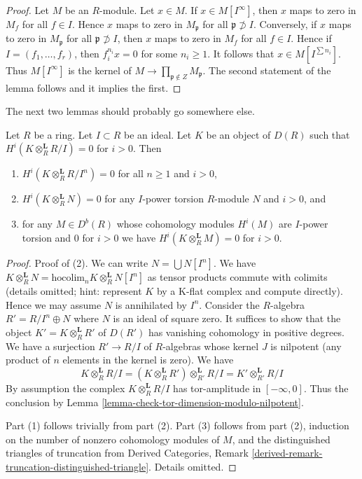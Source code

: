 \begin{proof}
Let $M$ be an $R$-module. Let $x \in M$. If $x \in M[I^\infty]$, then $x$
maps to zero in $M_f$ for all $f \in I$. Hence $x$ maps to zero in
$M_\mathfrak p$ for all $\mathfrak p \not \supset I$. Conversely, if $x$
maps to zero in $M_\mathfrak p$ for all $\mathfrak p \not \supset I$,
then $x$ maps to zero in $M_f$ for all $f \in I$. Hence if
$I = (f_1, \ldots, f_r)$, then $f_i^{n_i}x = 0$ for some $n_i \geq 1$.
It follows that $x \in M[I^{\sum n_i}]$. Thus $M[I^\infty]$ is
the kernel of $M \to \prod_{\mathfrak p \not \in Z} M_\mathfrak p$.
The second statement of the lemma follows and it implies the first.
\end{proof}

\noindent
The next two lemmas should probably go somewhere else.

\begin{lemma}
\label{lemma-bounded-above-mod-I}
Let $R$ be a ring. Let $I \subset R$ be an ideal. Let $K$ be an object of
$D(R)$ such that $H^i(K \otimes_R^\mathbf{L} R/I) = 0$ for $i > 0$. Then
\begin{enumerate}
\item $H^i(K \otimes_R^\mathbf{L} R/I^n) = 0$ for all $n \geq 1$
and $i > 0$,
\item $H^i(K \otimes_R^\mathbf{L} N) = 0$ for any $I$-power torsion
$R$-module $N$ and $i > 0$, and
\item for any $M \in D^b(R)$ whose cohomology modules $H^i(M)$
are $I$-power torsion and $0$ for $i > 0$ we have
$H^i(K \otimes_R^\mathbf{L} M) = 0$ for $i > 0$.
\end{enumerate}
\end{lemma}

\begin{proof}
Proof of (2). We can write $N = \bigcup N[I^n]$. We have
$K \otimes_R^\mathbf{L} N = \text{hocolim}_n K \otimes_R^\mathbf{L} N[I^n]$
as tensor products commute with colimits (details omitted; hint: represent
$K$ by a K-flat complex and compute directly).
Hence we may assume $N$ is annihilated by $I^n$.
Consider the $R$-algebra $R' = R/I^n \oplus N$
where $N$ is an ideal of square zero. It suffices to show that the object
$K' = K \otimes_R^\mathbf{L} R'$ of $D(R')$ has vanishing cohomology
in positive degrees.
We have a surjection $R' \to R/I$ of $R$-algebras whose kernel $J$
is nilpotent (any product of $n$ elements in the kernel is zero).
We have
$$
K \otimes_R^\mathbf{L} R/I =
(K \otimes_R^\mathbf{L} R') \otimes_{R'}^\mathbf{L} R/I =
K' \otimes_{R'}^\mathbf{L} R/I
$$
By assumption the complex $K \otimes_R^\mathbf{L} R/I$ has tor-amplitude
in $[-\infty, 0]$. Thus the conclusion by
Lemma \ref{lemma-check-tor-dimension-modulo-nilpotent}.

\medskip\noindent
Part (1) follows trivially from part (2).
Part (3) follows from part (2), induction on the number of nonzero
cohomology modules of $M$, and the distinguished triangles of truncation
from Derived Categories, Remark
\ref{derived-remark-truncation-distinguished-triangle}. Details omitted.
\end{proof}

